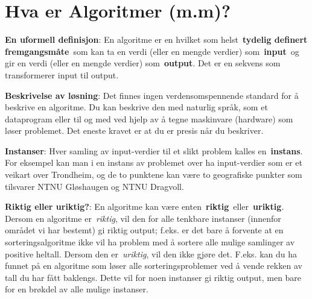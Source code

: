\documentclass[12pt]{report}
\begin{document}

\tableofcontents
{}



\newpage

\vspace{\baselineskip}\section*{Hva er Algoritmer (m.m)?}
\textbf{En uformell definisjon}: En algoritme er en hvilket som helst \textbf{tydelig definert fremgangsmåte} som kan ta en verdi (eller en mengde verdier) som \textbf{input} og gir en verdi (eller en mengde verdier) som \textbf{output}. Det er en sekvens som transformerer input til output.\par


\vspace{\baselineskip}
\textbf{Beskrivelse av løsning}: Det finnes ingen verdensomspennende standard for å beskrive en algoritme. Du kan beskrive den med naturlig språk, som et dataprogram eller til og med ved hjelp av å tegne maskinvare (hardware) som løser problemet. Det eneste kravet er at du er presis når du beskriver.\par


\vspace{\baselineskip}
\textbf{Instanser}: Hver samling av input-verdier til et slikt problem kalles en \textbf{instans}. For eksempel kan man i en instans av problemet over ha input-verdier som er et veikart over Trondheim, og de to punktene kan være to geografiske punkter som tilsvarer NTNU Gløshaugen og NTNU Dragvoll.\par


\vspace{\baselineskip}
\textbf{Riktig eller uriktig?}: En algoritme kan være enten \textbf{riktig} eller \textbf{uriktig}. Dersom en algoritme er \textit{riktig}, vil den for alle tenkbare instanser (innenfor området vi har bestemt) gi riktig output; f.eks. er det bare å forvente at en sorteringsalgoritme ikke vil ha problem med å sortere alle mulige samlinger av positive heltall. Dersom den er \textit{uriktig}, vil den ikke gjøre det. F.eks. kan du ha funnet på en algoritme som løser alle sorteringsproblemer ved å vende rekken av tall du har fått baklengs. Dette vil for noen instanser gi riktig output, men bare for en brøkdel av alle mulige instanser.\par
\end{document}
